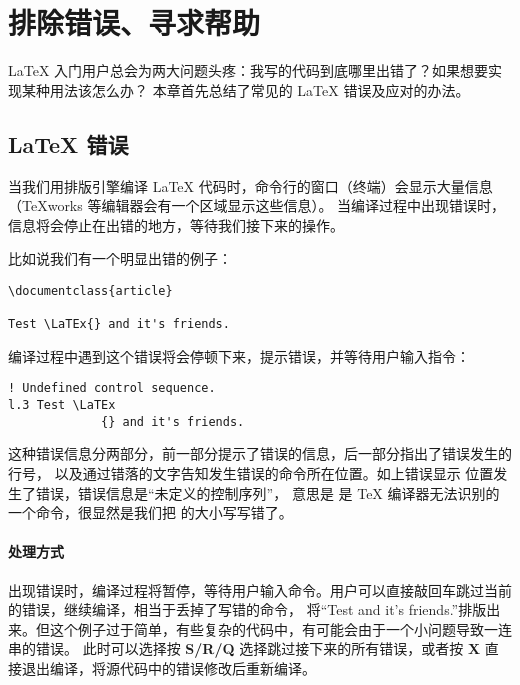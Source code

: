 \chapter{排除错误、寻求帮助}\label{chap:error-helps}

\begin{intro}
\LaTeX{} 入门用户总会为两大问题头疼：我写的代码到底哪里出错了？如果想要实现某种用法该怎么办？
本章首先总结了常见的 \LaTeX{} 错误及应对的办法。
\end{intro}

\section{\LaTeX{} 错误}\label{sec:errors}

当我们用排版引擎编译 \LaTeX{} 代码时，命令行的窗口（终端）会显示大量信息（TeXworks 等编辑器会有一个区域显示这些信息）。
当编译过程中出现错误时，信息将会停止在出错的地方，等待我们接下来的操作。

比如说我们有一个明显出错的例子：
\begin{verbatim}
\documentclass{article}

Test \LaTEx{} and it's friends.

\end{verbatim}

编译过程中遇到这个错误将会停顿下来，提示错误，并等待用户输入指令：
\begin{verbatim}
! Undefined control sequence.
l.3 Test \LaTEx
             {} and it's friends.
\end{verbatim}

这种错误信息分两部分，前一部分提示了错误的信息，后一部分指出了错误发生的行号，
以及通过错落的文字告知发生错误的命令所在位置。如上错误显示  位置发生了错误，错误信息是“未定义的控制序列”，
意思是  是 \TeX{} 编译器无法识别的一个命令，很显然是我们把  的大小写写错了。

\subsubsection{处理方式}

出现错误时，编译过程将暂停，等待用户输入命令。用户可以直接敲回车跳过当前的错误，继续编译，相当于丢掉了写错的命令，
将``Test and it's friends.''排版出来。但这个例子过于简单，有些复杂的代码中，有可能会由于一个小问题导致一连串的错误。
此时可以选择按 \textbf{S/R/Q} 选择跳过接下来的所有错误，或者按 \textbf{X} 直接退出编译，将源代码中的错误修改后重新编译。

